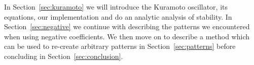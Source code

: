 
In Section~\ref{sec:kuramoto} we will introduce the Kuramoto oscillator, its equations, our implementation and do an analytic analysis of stability. In Section~\ref{sec:negative} we continue with describing the patterns we encountered when using negative coefficients. We then move on to describe a method which can be used to re-create arbitrary patterns in Section~\ref{sec:patterns} before concluding in Section~\ref{sec:conclusion}. 
